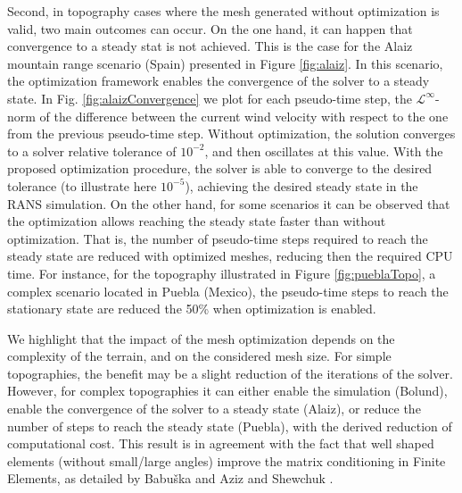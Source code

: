 \documentclass[1p]{elsarticle}
\begin{document}
Second, in topography cases where the mesh generated without optimization is valid, two main outcomes can occur.
On the one hand, it can happen that convergence to a steady stat is not achieved. This is the case for the Alaiz mountain range scenario (Spain) presented in Figure \ref{fig:alaiz}. In this scenario, the optimization framework enables the convergence of the solver to a steady state. 
In Fig. \ref{fig:alaizConvergence} we plot for each pseudo-time step, the $\mathcal{L}^{\infty}$-norm of the difference between the current wind velocity with respect to the one from the previous pseudo-time step.
Without optimization, the solution converges to a solver relative tolerance of $10^{-2}$, and then oscillates at this value. %
With the proposed optimization procedure, the solver is able to converge to the desired tolerance (to illustrate here $10^{-5}$), achieving the desired steady state in the RANS simulation.
On the other hand, for some scenarios it can be observed that the optimization allows reaching the steady state  faster than without optimization. That is, the number of pseudo-time steps required to reach the steady state are reduced with optimized meshes, reducing then the required CPU time.
For instance, for the topography illustrated in Figure \ref{fig:pueblaTopo}, a complex scenario located in Puebla (Mexico),
the pseudo-time steps to reach the stationary state are reduced the 50\%
when optimization is enabled.


We highlight that the impact of the mesh optimization depends on the complexity of the terrain, and on the considered mesh size. For simple topographies, the benefit may be a slight reduction of the iterations of the solver. However, for complex topographies it can either enable the simulation (Bolund), enable the convergence of the solver to a steady state (Alaiz), or reduce the number of steps to reach the steady state (Puebla), with the derived reduction of computational cost.
This result is in agreement with the fact that well shaped elements (without small/large angles) improve the matrix conditioning in Finite Elements, as detailed by Babu{\v{s}}ka and Aziz \cite{babuska:angle} and Shewchuk \cite{shewchuk:goodElements}. %
\end{document}
